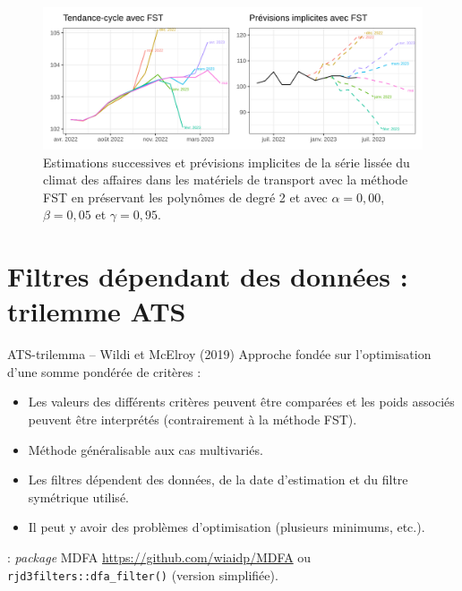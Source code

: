 \documentclass[
  12pt,
  a4paper,french]{article}
\newcommand\1{\mathds{1}}
\begin{document}
\begin{figure}

{\centering \includegraphics[width=1\linewidth]{img/ex/fst} 

}

\caption[Estimations successives et prévisions implicites de la série lissée du climat des affaires dans les matériels de transport avec la méthode FST en préservant les polynômes de degré 2 et avec \(\alpha=0,00\), \(\beta=0,05\) et \(\gamma=0,95\)]{Estimations successives et prévisions implicites de la série lissée du climat des affaires dans les matériels de transport avec la méthode FST en préservant les polynômes de degré 2 et avec \(\alpha=0,00\), \(\beta=0,05\) et \(\gamma=0,95\).}\label{fig:graphs-ex-fst}

\footnotesize
\normalsize\end{figure}

\hypertarget{sec-WildiMcLeroy}{%
\section{Filtres dépendant des données : trilemme ATS}\label{sec-WildiMcLeroy}}

\begin{summary_box}{ATS-trilemma -- Wildi et McElroy (2019)}
Approche fondée sur l'optimisation d'une somme pondérée de critères :

\begin{itemize}
\item
  Les valeurs des différents critères peuvent être comparées et les poids associés peuvent être interprétés (contrairement à la méthode FST).
\item
  Méthode généralisable aux cas multivariés.
\item
  Les filtres dépendent des données, de la date d'estimation et du filtre symétrique utilisé.
\item
  Il peut y avoir des problèmes d'optimisation (plusieurs minimums, etc.).
\end{itemize}

\textbf{} : \emph{package} MDFA \url{https://github.com/wiaidp/MDFA} ou \texttt{rjd3filters::dfa\_filter()} (version simplifiée).

\end{summary_box}
\end{document}
